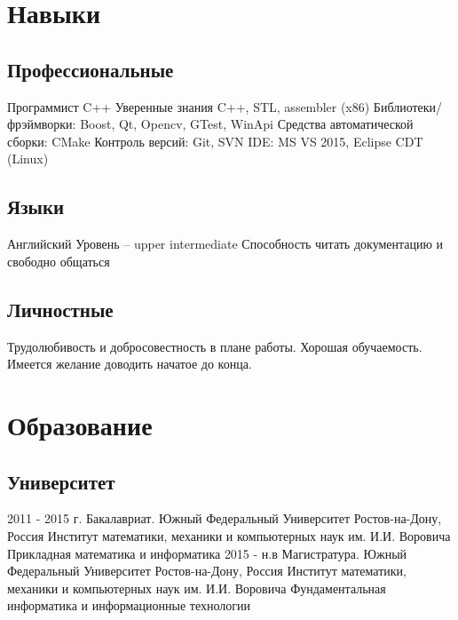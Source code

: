 \documentclass[11pt,a4paper]{moderncv}
\begin{document}
\maketitle

\section{Навыки}
  \subsection{Профессиональные}
    \cvline
    {Программист C++}
      {
      Уверенные знания C++, STL, assembler (x86)\newline{}
      Библиотеки/фрэймворки: Boost, Qt, Opencv, GTest, WinApi \newline{}
      Средства автоматической сборки: CMake \newline{}
      Контроль версий: Git, SVN \newline{}
      IDE: MS VS 2015, Eclipse CDT (Linux)
      }
  \subsection{Языки}
    \cvline
    {Английский}
      {
      Уровень -- upper intermediate \newline{}
      Способность читать документацию и свободно общаться
      }
  \subsection{Личностные}
    \cvline{}
    { Трудолюбивость и добросовестность в плане работы. Хорошая обучаемость. Имеется желание доводить начатое до конца.
     }

\section{Образование}
  \subsection{Университет}
    \cventry
      {2011 - 2015 г.}
      {Бакалавриат. Южный Федеральный Университет}
      {Ростов-на-Дону, Россия}
      {Институт математики, механики и компьютерных наук им. И.И. Воровича}
      {Прикладная математика и информатика}
      {}
    \cventry
      {2015 - н.в}
      {Магистратура. Южный Федеральный Университет}
      {Ростов-на-Дону, Россия}
      {Институт математики, механики и компьютерных наук им. И.И. Воровича}
      {Фундаментальная информатика и информационные технологии}
      {}
\end{document}
